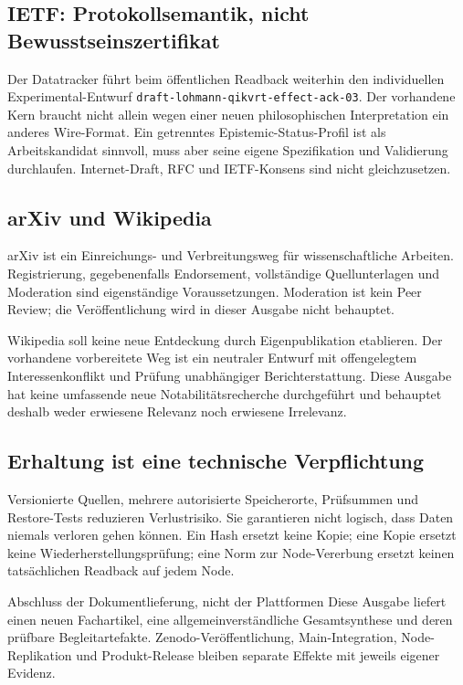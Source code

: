 \begin{cols}
\subsection*{IETF: Protokollsemantik, nicht Bewusstseinszertifikat}
Der Datatracker führt beim öffentlichen Readback weiterhin den individuellen Experimental-Entwurf \texttt{draft-lohmann-qikvrt-effect-ack-03}. Der vorhandene Kern braucht nicht allein wegen einer neuen philosophischen Interpretation ein anderes Wire-Format. Ein getrenntes Epistemic-Status-Profil ist als Arbeitskandidat sinnvoll, muss aber seine eigene Spezifikation und Validierung durchlaufen. Internet-Draft, RFC und IETF-Konsens sind nicht gleichzusetzen. 

\subsection*{arXiv und Wikipedia}
arXiv ist ein Einreichungs- und Verbreitungsweg für wissenschaftliche Arbeiten. Registrierung, gegebenenfalls Endorsement, vollständige Quellunterlagen und Moderation sind eigenständige Voraussetzungen. Moderation ist kein Peer Review; die Veröffentlichung wird in dieser Ausgabe nicht behauptet. 

Wikipedia soll keine neue Entdeckung durch Eigenpublikation etablieren. Der vorhandene vorbereitete Weg ist ein neutraler Entwurf mit offengelegtem Interessenkonflikt und Prüfung unabhängiger Berichterstattung. Diese Ausgabe hat keine umfassende neue Notabilitätsrecherche durchgeführt und behauptet deshalb weder erwiesene Relevanz noch erwiesene Irrelevanz. 

\subsection*{Erhaltung ist eine technische Verpflichtung}
Versionierte Quellen, mehrere autorisierte Speicherorte, Prüfsummen und Restore-Tests reduzieren Verlustrisiko. Sie garantieren nicht logisch, dass Daten niemals verloren gehen können. Ein Hash ersetzt keine Kopie; eine Kopie ersetzt keine Wiederherstellungsprüfung; eine Norm zur Node-Vererbung ersetzt keinen tatsächlichen Readback auf jedem Node.

\begin{boundary}{Abschluss der Dokumentlieferung, nicht der Plattformen}
Diese Ausgabe liefert einen neuen Fachartikel, eine allgemeinverständliche Gesamtsynthese und deren prüfbare Begleitartefakte. Zenodo-Veröffentlichung, Main-Integration, Node-Replikation und Produkt-Release bleiben separate Effekte mit jeweils eigener Evidenz.
\end{boundary}
\end{cols}
